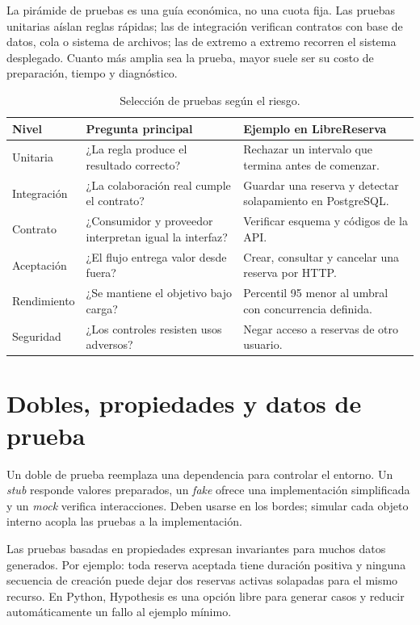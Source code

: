 La pirámide de pruebas es una guía económica, no una cuota fija. Las pruebas unitarias aíslan reglas rápidas; las de integración verifican contratos con base de datos, cola o sistema de archivos; las de extremo a extremo recorren el sistema desplegado. Cuanto más amplia sea la prueba, mayor suele ser su costo de preparación, tiempo y diagnóstico.

\begin{table}[htbp]
\centering
\caption{Selección de pruebas según el riesgo.}
\begin{tabularx}{\textwidth}{p{2.7cm}X X}
\toprule
\textbf{Nivel} & \textbf{Pregunta principal} & \textbf{Ejemplo en LibreReserva}\\
\midrule
Unitaria & ¿La regla produce el resultado correcto? & Rechazar un intervalo que termina antes de comenzar.\\
Integración & ¿La colaboración real cumple el contrato? & Guardar una reserva y detectar solapamiento en PostgreSQL.\\
Contrato & ¿Consumidor y proveedor interpretan igual la interfaz? & Verificar esquema y códigos de la API.\\
Aceptación & ¿El flujo entrega valor desde fuera? & Crear, consultar y cancelar una reserva por HTTP.\\
Rendimiento & ¿Se mantiene el objetivo bajo carga? & Percentil 95 menor al umbral con concurrencia definida.\\
Seguridad & ¿Los controles resisten usos adversos? & Negar acceso a reservas de otro usuario.\\
\bottomrule
\end{tabularx}
\end{table}

\section{Dobles, propiedades y datos de prueba}

Un doble de prueba reemplaza una dependencia para controlar el entorno. Un \emph{stub} responde valores preparados, un \emph{fake} ofrece una implementación simplificada y un \emph{mock} verifica interacciones. Deben usarse en los bordes; simular cada objeto interno acopla las pruebas a la implementación.

Las pruebas basadas en propiedades expresan invariantes para muchos datos generados. Por ejemplo: toda reserva aceptada tiene duración positiva y ninguna secuencia de creación puede dejar dos reservas activas solapadas para el mismo recurso. En Python, Hypothesis es una opción libre para generar casos y reducir automáticamente un fallo al ejemplo mínimo.

